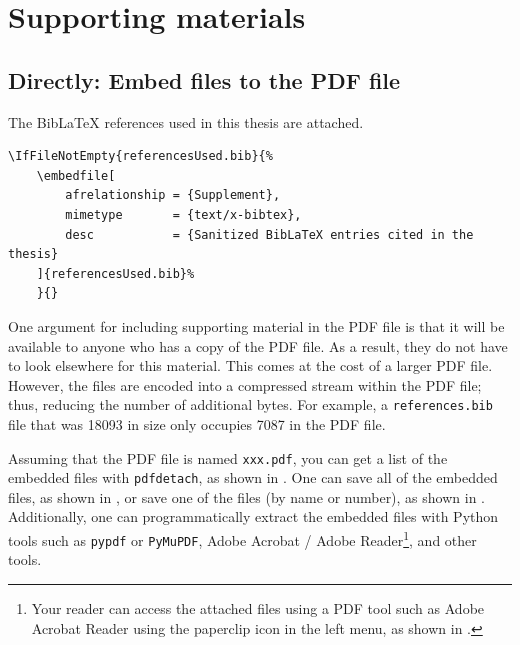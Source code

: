 \documentclass[
English,                 %
includepublications,    %
%
%
%
%
%
%
%
%
%
%
%
%
%
%
%
%
%
%
]{kththesis}
\begin{document}
\cleardoublepage
\appendix
\renewcommand{\chaptermark}[1]{\markboth{Appendix \thechapter\relax:\thinspace\relax#1}{}}
\chapter{Supporting materials}
\label{sec:supportingMaterial}

\section{Directly: Embed files to the PDF file}
The BibLaTeX references used in this thesis are attached.
\begin{lstlisting}[language={[LaTeX]TeX}, caption={Embedding referencesUsed.bib file}, label=lst:exampleOfEmbedding]
\IfFileNotEmpty{referencesUsed.bib}{%
    \embedfile[
        afrelationship = {Supplement},
        mimetype       = {text/x-bibtex},
        desc           = {Sanitized BibLaTeX entries cited in the thesis}
    ]{referencesUsed.bib}%
    }{}
\end{lstlisting}

One argument for including supporting material in the \gls{PDF} file is that it will be available to anyone who has a copy of the \gls{PDF} file. As a result, they do not have to look elsewhere for this material. This comes at the cost of a larger \gls{PDF} file. However, the files are encoded into a compressed stream within the \gls{PDF} file; thus, reducing the number of additional bytes. For example, a \texttt{references.bib} file that was \qty{18093}{\byte} in size only occupies \qty{7087}{\byte} in the \gls{PDF} file.

Assuming that the \gls{PDF} file is named \texttt{xxx.pdf}, you can get a list of the embedded files with \texttt{pdfdetach}, as shown in . One can save all of the embedded files, as shown in , or save one of the files (by name or number), as shown in . Additionally, one can programmatically extract the embedded files with Python tools such as \texttt{pypdf} or \texttt{PyMuPDF}, Adobe Acrobat / Adobe Reader\footnote{Your reader can access the attached files using a PDF tool such as Adobe Acrobat Reader using the paperclip icon in the left menu, as shown in .}, and other tools.
\end{document}
